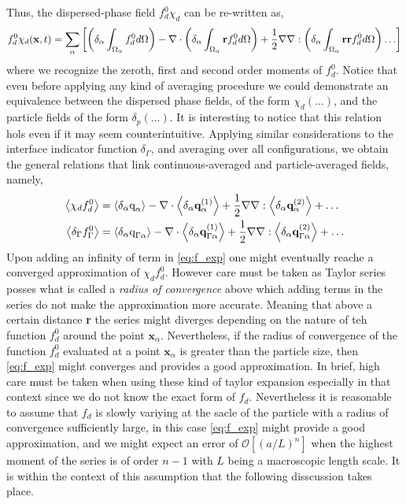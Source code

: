 Thus, the dispersed-phase field $f_d^0\chi_d$ can be re-written as, 
\begin{equation*}
    f^0_d \chi_d(\textbf{x},t)
    = \sum_\alpha \left[
          \left(\delta_\alpha\int_{\Omega_{\alpha}} f^0_d d\Omega\right)
        - \mathbf{\nabla}\cdot\left(\delta_\alpha\int_{\Omega_{\alpha}} \textbf{r} f^0_d d\Omega\right)
        + \frac{1}{2}\mathbf{\nabla}\mathbf{\nabla} :\left(\delta_\alpha\int_{\Omega_{\alpha}} \textbf{rr} f^0_d d\Omega\right)
        \ldots
    \right]
\end{equation*}
where we recognize the zeroth, first and second order moments of $f_d^0$. 
Notice that even before applying any kind of averaging procedure we could demonstrate an equivalence between the dispersed phase fields, of the form $\chi_d(\ldots)$, and the particle fields of the form $\delta_p(\ldots)$. 
It is interesting to notice that this relation hols even if it may seem counterintuitive. 
Applying similar considerations to the interface indicator function $\delta_\Gamma$, and averaging over all configurations, we obtain the general relations that link continuous-averaged and particle-averaged fields, namely, 
\begin{align}
    \left<\chi_df_d^0\right> 
    &=  \left<\delta_\alpha \text q_\alpha\right>
        - \mathbf{\nabla}\cdot  
        \left<\delta_\alpha \textbf{q}_\alpha^{(1)}\right>        
        + \frac{1}{2} \mathbf{\nabla}\mathbf{\nabla} : \left<\delta_\alpha \textbf{q}_{\alpha}^{(2)}\right>
        + \ldots  
        \nonumber\\
    \left<\delta_\Gamma  f_\Gamma ^0\right> 
    &=  \left<\delta_\alpha \text q_{\Gamma \alpha}\right>        
        - \mathbf{\nabla}\cdot \left<\delta_\alpha \textbf{q}_{\Gamma\alpha}^{(1)}\right>
        + \frac{1}{2} \mathbf{\nabla}\mathbf{\nabla} : \left<\delta_\alpha \textbf{q}_{\Gamma\alpha}^{(2)}\right>
        + \ldots  
    \label{eq:f_exp}
\end{align}
Upon adding an infinity of term in \ref{eq:f_exp} one might eventually reache a converged approximation of $\chi_d f_d^0$. 
However care must be taken as Taylor series posses what is called a \textit{radius of convergence} above which adding terms in the series do not make the approximation more accurate\citep[Chapter 1]{appel2007}. 
Meaning that above a certain distance \textbf{r} the series might diverges depending on the nature of teh function $f_d^0$ around the point $\textbf{x}_\alpha$. 
Nevertheless, if the radius of convergence of the function $f_d^0$ evaluated at a point $\textbf{x}_\alpha$ is greater than the particle size, then \ref{eq:f_exp} might converges and provides a good approximation.
In brief, high care must be taken when using these kind of taylor expansion especially in that context since we do not know the exact form of $f_d$.  
Nevertheless it is reasonable to assume that $f_d$ is slowly variying at the sacle of the particle with a radius of convergence sufficiently large, in this case \ref{eq:f_exp} might provide a good approximation, 
and we might expect an error of $\mathcal{O}[(a/L)^{n}]$ when the highest moment of the series is of order $n-1$ with $L$ being a macroscopic length scale. 
It is within the context of this assumption that the following disscussion takes place. 

